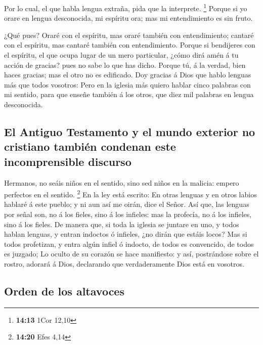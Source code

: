  Por lo cual, el que habla lengua extraña, pida que la
interprete. \footnote{\textbf{14:13} 1Cor 12,10}  Porque si
yo orare en lengua desconocida, mi espíritu ora; mas mi entendimiento es
sin fruto.

 ¿Qué pues? Oraré con el espíritu, mas oraré también con
entendimiento; cantaré con el espíritu, mas cantaré también con
entendimiento.  Porque si bendijeres con el espíritu, el
que ocupa lugar de un mero particular, ¿cómo dirá amén á tu acción de
gracias? pues no sabe lo que has dicho.  Porque tú, á la
verdad, bien haces gracias; mas el otro no es edificado. 
Doy gracias á Dios que hablo lenguas más que todos vosotros:
 Pero en la iglesia más quiero hablar cinco palabras con mi
sentido, para que enseñe también á los otros, que diez mil palabras en
lengua desconocida.

\hypertarget{el-antiguo-testamento-y-el-mundo-exterior-no-cristiano-tambiuxe9n-condenan-este-incomprensible-discurso}{%
\subsection{El Antiguo Testamento y el mundo exterior no cristiano
también condenan este incomprensible
discurso}\label{el-antiguo-testamento-y-el-mundo-exterior-no-cristiano-tambiuxe9n-condenan-este-incomprensible-discurso}}

 Hermanos, no seáis niños en el sentido, sino sed niños en
la malicia: empero perfectos en el sentido. \footnote{\textbf{14:20}
  Efes 4,14}  En la ley está escrito: En otras lenguas y en
otros labios hablaré á este pueblo; y ni aun así me oirán, dice el
Señor.  Así que, las lenguas por señal son, no á los
fieles, sino á los infieles: mas la profecía, no á los infieles, sino á
los fieles.  De manera que, si toda la iglesia se juntare
en uno, y todos hablan lenguas, y entran indoctos ó infieles, ¿no dirán
que estáis locos?  Mas si todos profetizan, y entra algún
infiel ó indocto, de todos es convencido, de todos es juzgado;
 Lo oculto de su corazón se hace manifiesto: y así,
postrándose sobre el rostro, adorará á Dios, declarando que
verdaderamente Dios está en vosotros.

\hypertarget{orden-de-los-altavoces}{%
\subsection{Orden de los altavoces}\label{orden-de-los-altavoces}}

